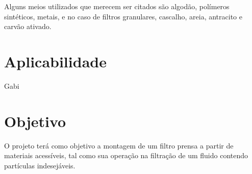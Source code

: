 Alguns meios utilizados que merecem ser citados são algodão, polímeros
sintéticos, metais, e no caso de filtros granulares, cascalho, areia, antracito
e carvão ativado.


\section{Aplicabilidade}\label{sec:aplicabilidade}

Gabi

\section{Objetivo}\label{sec:objetivos} 

O projeto terá como objetivo a montagem de um filtro prensa a partir de
materiais acessíveis, tal como sua operação na filtração de um fluido contendo
partículas indesejáveis.


